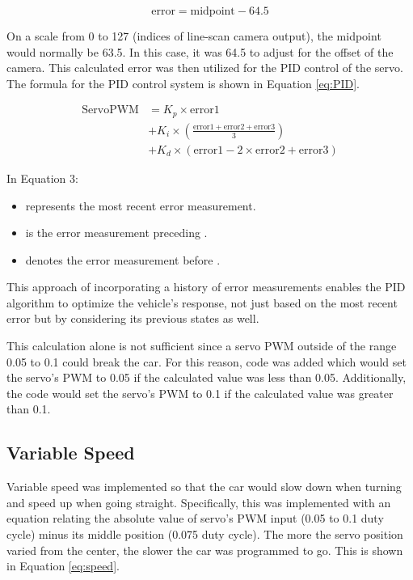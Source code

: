 \documentclass[conference]{IEEEtran}
\begin{document}
\begin{equation}
	\text{error} = \text{midpoint} - 64.5 \label{eq:error}
\end{equation}

On a scale from 0 to 127 (indices of line-scan camera output), the midpoint would normally be 63.5. In this case, it was 64.5 to adjust for the offset of the camera. This calculated error was then utilized for the PID control of the servo. The formula for the PID control system is shown in Equation \ref{eq:PID}.

\begin{equation}
	\begin{aligned}
		\text{ServoPWM} &= K_p \times \text{error1} \\
					&+ K_i \times \left( \frac{\text{error1} + \text{error2} + \text{error3}}{3} \right) \\
					&+ K_d \times (\text{error1} - 2 \times \text{error2} + \text{error3})
	\end{aligned}
	\label{eq:PID}
\end{equation}

In Equation 3:
\begin{itemize}
\item {} represents the most recent error measurement.
\item {} is the error measurement preceding .
\item {} denotes the error measurement before .
\end{itemize}
This approach of incorporating a history of error measurements enables the PID algorithm to optimize the vehicle's response, not just based on the most recent error but by considering its previous states as well.

This calculation alone is not sufficient since a servo PWM outside of the range 0.05 to 0.1 could break the car. For this reason, code was added which would set the servo's PWM to 0.05 if the calculated value was less than 0.05. Additionally, the code would set the servo's PWM to 0.1 if the calculated value was greater than 0.1.

\subsection{Variable Speed}

Variable speed was implemented so that the car would slow down when turning and speed up when going straight. Specifically, this was implemented with an equation relating the absolute value of servo's PWM input (0.05 to 0.1 duty cycle) minus its middle position (0.075 duty cycle). The more the servo position varied from the center, the slower the car was programmed to go. This is shown in Equation \ref{eq:speed}.
\end{document}
